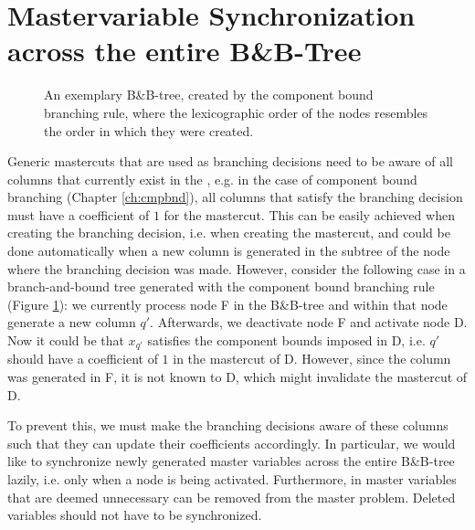 \section{Mastervariable Synchronization across the entire B\&B-Tree}\label{sec:gm_sync}
\begin{figure}[H]
\centering
{}
\caption{An exemplary B\&B-tree, created by the component bound branching rule, where the lexicographic order of the nodes resembles the order in which they were created.}
\label{fig:gm_sync_tree}
\end{figure}

Generic mastercuts that are used as branching decisions need to be aware of all columns that currently exist in the \RMP{}, e.g. in the case of component bound branching (Chapter \ref{ch:cmpbnd}), all columns that satisfy the branching decision must have a coefficient of $1$ for the mastercut. This can be easily achieved when creating the branching decision, i.e. when creating the mastercut, and could be done automatically when a new column is generated in the subtree of the node where the branching decision was made. However, consider the following case in a branch-and-bound tree generated with the component bound branching rule (Figure \ref{fig:gm_sync_tree}): we currently process node F in the B\&B-tree and within that node generate a new column $q'$. Afterwards, we deactivate node F and activate node D. Now it could be that $x_{q'}$ satisfies the component bounds imposed in D, i.e. $q'$ should have a coefficient of $1$ in the mastercut of D. However, since the column was generated in F, it is not known to D, which might invalidate the mastercut of D.

To prevent this, we must make the branching decisions aware of these columns such that they can update their coefficients accordingly. In particular, we would like to synchronize newly generated master variables across the entire B\&B-tree lazily, i.e. only when a node is being activated. Furthermore, in \GCG{} master variables that are deemed unnecessary can be removed from the master problem. Deleted variables should not have to be synchronized.

